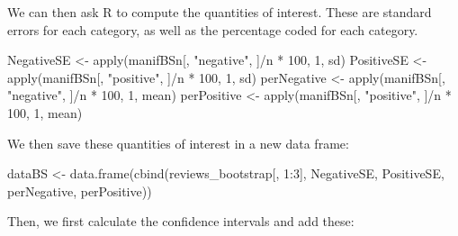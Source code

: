 \documentclass[
]{article}
\newenvironment{Shaded}{\begin{snugshade}}{\end{snugshade}}
\newcommand{\DecValTok}[1]{\textcolor[rgb]{0.00,0.00,0.81}{#1}}
\newcommand{\FunctionTok}[1]{\textcolor[rgb]{0.00,0.00,0.00}{#1}}
\newcommand{\NormalTok}[1]{#1}
\newcommand{\OtherTok}[1]{\textcolor[rgb]{0.56,0.35,0.01}{#1}}
\newcommand{\SpecialCharTok}[1]{\textcolor[rgb]{0.00,0.00,0.00}{#1}}
\newcommand{\StringTok}[1]{\textcolor[rgb]{0.31,0.60,0.02}{#1}}
\begin{document}
We can then ask R to compute the quantities of interest. These are standard errors for each category, as well as the percentage coded for each category.

\begin{Shaded}
\begin{Highlighting}[]
\NormalTok{NegativeSE }\OtherTok{\textless{}{-}} \FunctionTok{apply}\NormalTok{(manifBSn[, }\StringTok{"negative"}\NormalTok{, ]}\SpecialCharTok{/}\NormalTok{n }\SpecialCharTok{*} \DecValTok{100}\NormalTok{, }\DecValTok{1}\NormalTok{, sd)}
\NormalTok{PositiveSE }\OtherTok{\textless{}{-}} \FunctionTok{apply}\NormalTok{(manifBSn[, }\StringTok{"positive"}\NormalTok{, ]}\SpecialCharTok{/}\NormalTok{n }\SpecialCharTok{*} \DecValTok{100}\NormalTok{, }\DecValTok{1}\NormalTok{, sd)}
\NormalTok{perNegative }\OtherTok{\textless{}{-}} \FunctionTok{apply}\NormalTok{(manifBSn[, }\StringTok{"negative"}\NormalTok{, ]}\SpecialCharTok{/}\NormalTok{n }\SpecialCharTok{*} \DecValTok{100}\NormalTok{, }\DecValTok{1}\NormalTok{, mean)}
\NormalTok{perPositive }\OtherTok{\textless{}{-}} \FunctionTok{apply}\NormalTok{(manifBSn[, }\StringTok{"positive"}\NormalTok{, ]}\SpecialCharTok{/}\NormalTok{n }\SpecialCharTok{*} \DecValTok{100}\NormalTok{, }\DecValTok{1}\NormalTok{, mean)}
\end{Highlighting}
\end{Shaded}

We then save these quantities of interest in a new data frame:

\begin{Shaded}
\begin{Highlighting}[]
\NormalTok{dataBS }\OtherTok{\textless{}{-}} \FunctionTok{data.frame}\NormalTok{(}\FunctionTok{cbind}\NormalTok{(reviews\_bootstrap[, }\DecValTok{1}\SpecialCharTok{:}\DecValTok{3}\NormalTok{], NegativeSE,}
\NormalTok{    PositiveSE, perNegative, perPositive))}
\end{Highlighting}
\end{Shaded}

Then, we first calculate the confidence intervals and add these:
\end{document}
